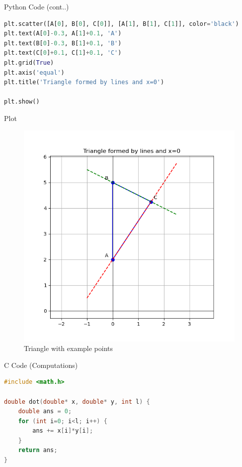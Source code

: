 \documentclass{beamer}
\begin{document}
\begin{frame}[fragile]{Python Code (cont..)}
\begin{lstlisting}[language=Python]
plt.scatter([A[0], B[0], C[0]], [A[1], B[1], C[1]], color='black')
plt.text(A[0]-0.3, A[1]+0.1, 'A')
plt.text(B[0]-0.3, B[1]+0.1, 'B')
plt.text(C[0]+0.1, C[1]+0.1, 'C')
plt.grid(True)
plt.axis('equal')
plt.title('Triangle formed by lines and x=0')

plt.show()
\end{lstlisting}
\end{frame}

\begin{frame}[fragile]{Plot}
\begin{figure}[H]\centering
\includegraphics[width=0.8\columnwidth]{figs/plt.png}
\caption{Triangle with example points}
\label{fig:plt}
\end{figure}
\end{frame}


\begin{frame}[fragile]{C Code (Computations)}
\begin{lstlisting}[language=C]
#include <math.h>

double dot(double* x, double* y, int l) {
    double ans = 0;
    for (int i=0; i<l; i++) {
        ans += x[i]*y[i];
    }
    return ans;
}
\end{lstlisting}
\end{frame}
\end{document}
